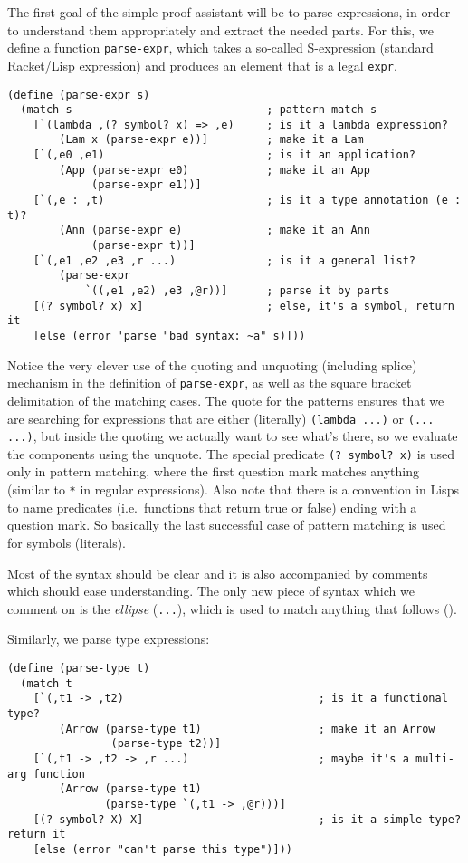 The first goal of the simple proof assistant will be to parse expressions,
in order to understand them appropriately and extract the needed parts.
For this, we define a function \texttt{parse-expr}, which takes a so-called
S-expression (standard Racket/Lisp expression) and produces an element
that is a legal \texttt{expr}.
{
  \small
\begin{verbatim}
(define (parse-expr s)
  (match s                              ; pattern-match s
    [`(lambda ,(? symbol? x) => ,e)     ; is it a lambda expression?
        (Lam x (parse-expr e))]         ; make it a Lam
    [`(,e0 ,e1)                         ; is it an application?
        (App (parse-expr e0)            ; make it an App
             (parse-expr e1))]
    [`(,e : ,t)                         ; is it a type annotation (e : t)?
        (Ann (parse-expr e)             ; make it an Ann
             (parse-expr t))]
    [`(,e1 ,e2 ,e3 ,r ...)              ; is it a general list?
        (parse-expr 
            `((,e1 ,e2) ,e3 ,@r))]      ; parse it by parts
    [(? symbol? x) x]                   ; else, it's a symbol, return it
    [else (error 'parse "bad syntax: ~a" s)]))
\end{verbatim}
}

Notice the very clever use of the quoting and unquoting (including splice)
mechanism in the definition of \texttt{parse-expr}, as well as the square bracket
delimitation of the matching cases. The quote for the patterns ensures that
we are searching for expressions that are either (literally) \texttt{(lambda ...)}
or \texttt{(... ...)}, but inside the quoting we actually want to see
what's there, so we evaluate the components using the unquote.
The special predicate \texttt{(?\!\! symbol?\!\! x)} is used only in pattern
matching, where the first question mark matches anything (similar to
\texttt{*} in regular expressions). Also note that there is a convention
in Lisps to name predicates (i.e.\ functions that return true or false)
ending with a question mark. So basically the last successful case
of pattern matching is used for symbols (literals).

Most of the syntax should be clear and it is also accompanied by
comments which should ease understanding. The only new piece of syntax
which we comment on is the \emph{ellipse} (\texttt{...}), which is used
to match anything that follows ().

Similarly, we parse type expressions:
{
  \small
\begin{verbatim}
(define (parse-type t)
  (match t
    [`(,t1 -> ,t2)                              ; is it a functional type?
        (Arrow (parse-type t1)                  ; make it an Arrow
                (parse-type t2))]
    [`(,t1 -> ,t2 -> ,r ...)                    ; maybe it's a multi-arg function
        (Arrow (parse-type t1)
               (parse-type `(,t1 -> ,@r)))]
    [(? symbol? X) X]                           ; is it a simple type? return it
    [else (error "can't parse this type")]))
\end{verbatim}
}

